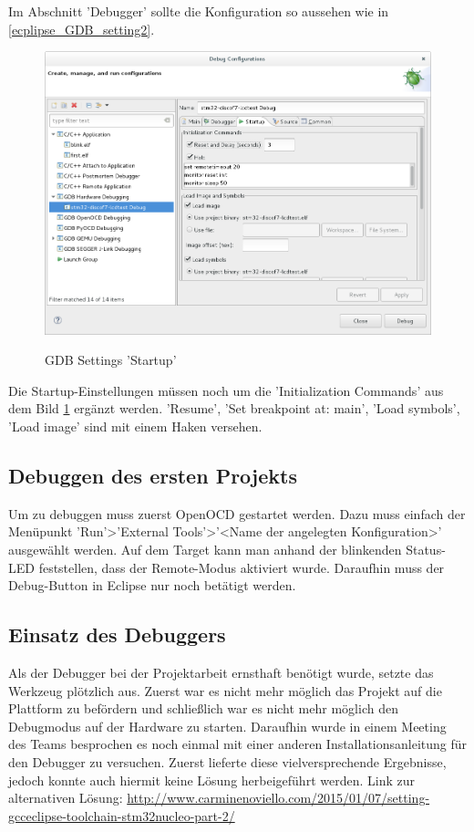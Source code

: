Im Abschnitt 'Debugger' sollte die Konfiguration so aussehen wie in \ref{ecplipse_GDB_setting2}.
\begin{figure}[h]
\begin{center}
\includegraphics[width=12cm]{grafiken/debugger/GDBsetting3.png}
\label{ecplipse_GDB_setting3}
\caption{GDB Settings 'Startup'}
\end{center}
\end{figure}
Die Startup-Einstellungen müssen noch um die 'Initialization Commands' aus dem Bild \ref{ecplipse_GDB_setting3} ergänzt werden.
'Resume', 'Set breakpoint at: main', 'Load symbols', 'Load image' sind mit einem Haken versehen. 
\FloatBarrier
\subsection{Debuggen des ersten Projekts}
Um zu debuggen muss zuerst OpenOCD gestartet werden. Dazu muss einfach der Menüpunkt 'Run'>'External Tools'>'<Name der angelegten Konfiguration>' ausgewählt werden. Auf dem Target kann man anhand der blinkenden Status-LED feststellen, dass der Remote-Modus aktiviert wurde. Daraufhin muss der Debug-Button in Eclipse nur noch betätigt werden.
\subsection{Einsatz des Debuggers}
Als der Debugger bei der Projektarbeit ernsthaft benötigt wurde, setzte das Werkzeug plötzlich aus. Zuerst war es nicht mehr möglich das Projekt auf die Plattform zu befördern und schließlich war es nicht mehr möglich den Debugmodus auf der Hardware zu starten. 
Daraufhin wurde in einem Meeting des Teams besprochen es noch einmal mit einer anderen Installationsanleitung für den Debugger zu versuchen. Zuerst lieferte diese vielversprechende Ergebnisse, jedoch konnte auch hiermit keine Lösung herbeigeführt werden. 
Link zur alternativen Lösung: \url{http://www.carminenoviello.com/2015/01/07/setting-gcceclipse-toolchain-stm32nucleo-part-2/}
